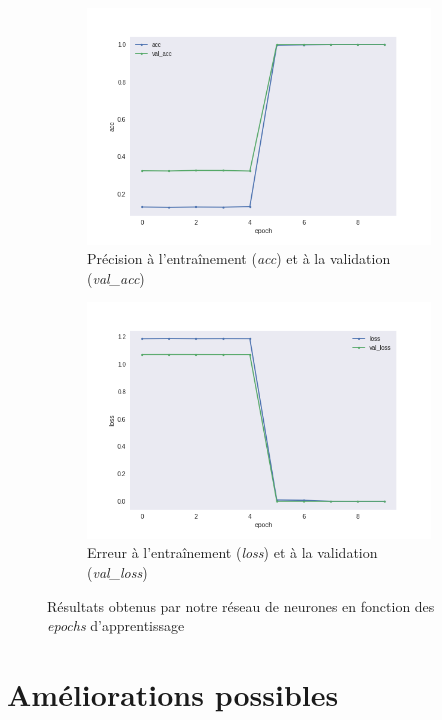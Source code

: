 \documentclass[10pt,a4paper]{article}
\begin{document}
   		\begin{figure}[h]
   			\centering
   			\begin{subfigure}{.4\textwidth}
   				\centering
   				\includegraphics[width=.9\textwidth]{acc}
   				\caption{Précision à l'entraînement (\textit{acc}) et à la validation (\textit{val\_acc})}
   			\end{subfigure}%
   			\begin{subfigure}{.4\textwidth}
   				\centering
   				\includegraphics[width=.9\textwidth]{loss}
   				\caption{Erreur à l'entraînement (\textit{loss}) et à la validation (\textit{val\_loss})}
   			\end{subfigure}
   			
   			\caption{Résultats obtenus par notre réseau de neurones en fonction des \textit{epochs} d'apprentissage}
   			\label{fig:res}
   		\end{figure}
   		
   	
   	\section{Améliorations possibles}
   	
\end{document}
